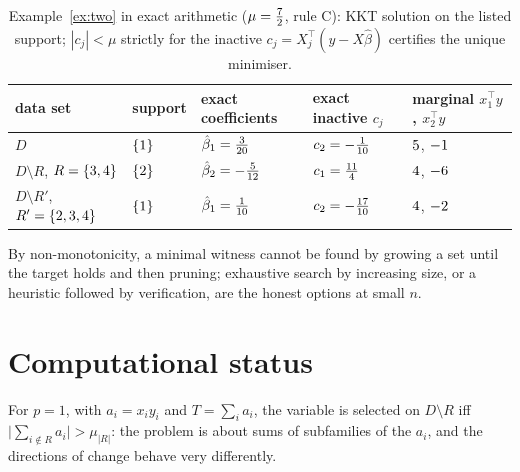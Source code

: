\documentclass[10pt,a4paper]{article}
\theoremstyle{plain}
\theoremstyle{definition}
\theoremstyle{remark}
\newcommand{\Dm}{D\setminus R}
\begin{document}
\begin{table}[t]
\centering\footnotesize
\setlength{\tabcolsep}{4pt}
\begin{tabular}{lllll}
\toprule
data set & support & exact coefficients & exact inactive $c_j$ & marginal $x_1^{\top}y$, $x_2^{\top}y$\\
\midrule
$D$ & $\{1\}$ & $\hat\beta_{1}=\tfrac{3}{20}$ & $c_{2}=-\tfrac{1}{10}$ & $5$, $-1$\\
$\Dm$, $R=\{3,4\}$ & $\{2\}$ & $\hat\beta_{2}=-\tfrac{5}{12}$ & $c_{1}=\tfrac{11}{4}$ & $4$, $-6$\\
$D\setminus R'$, $R'=\{2,3,4\}$ & $\{1\}$ & $\hat\beta_{1}=\tfrac{1}{10}$ & $c_{2}=-\tfrac{17}{10}$ & $4$, $-2$\\
\bottomrule
\end{tabular}
\caption{Example~\ref{ex:two} in exact arithmetic ($\mu=\tfrac{7}{2}$, rule C): KKT solution on the listed support; $|c_j|<\mu$ strictly for the inactive $c_j=X_j^{\top}(y-X\hat\beta)$ certifies the unique minimiser.}
\label{tab:ex2}
\end{table}

By non-monotonicity, a minimal witness cannot be found by growing a set until the target holds and then pruning; exhaustive search by increasing size, or a heuristic followed by verification, are the honest options at small $n$.

\section{Computational status}\label{sec:hardness}

For $p=1$, with $a_i=x_iy_i$ and $T=\sum_ia_i$, the variable is selected on $\Dm$ iff $\bigl|\sum_{i\notin R}a_i\bigr|>\mu_{|R|}$: the problem is about sums of subfamilies of the $a_i$, and the directions of change behave very differently.
\end{document}
